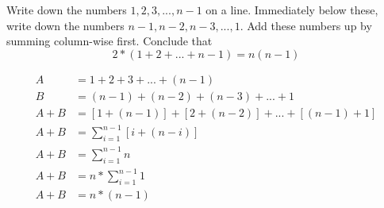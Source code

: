 \documentclass{article}
\begin{document}
    Write down the numbers $1, 2, 3, ..., n-1$ on a line. Immediately below 
   these, write down the numbers $n - 1, n - 2, n - 3,..., 1$. Add these numbers up by 
   summing column-wise first. Conclude that 
   $$2*(1 + 2 + ... + n - 1) = n(n - 1)$$
   
   \begin{align*}
	A & = 1+2+3+...+(n-1)\\
	B &= (n-1) + (n-2) + (n-3) + ... + 1\\
	A + B &= [1 + (n - 1)] + [2 + (n-2)] + ... + [(n-1) + 1]\\
	A + B &= \sum_{i=1}^{n-1}{[i+(n-i)]}\\
	A + B &= \sum_{i=1}^{n-1}{n}\\
	A + B &= n*\sum_{i=1}^{n-1}{1}\\	
	A + B &= n*(n-1)\\
   \end{align*}
   	
    
    
\end{document}
